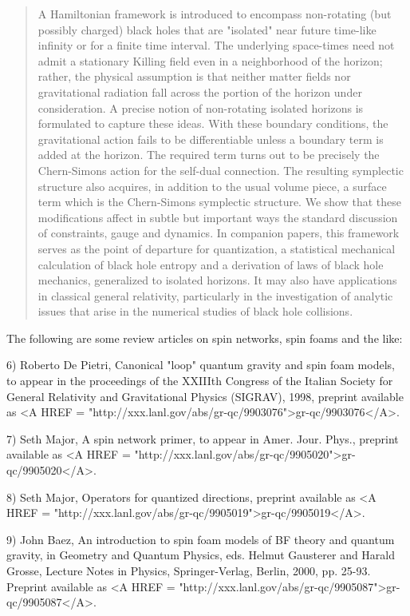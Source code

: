 \begin{quote}
A Hamiltonian framework is introduced to encompass non-rotating (but
possibly charged) black holes that are "isolated" near future
time-like infinity or for a finite time interval.  The underlying
space-times need not admit a stationary Killing field even in a
neighborhood of the horizon; rather, the physical assumption is that
neither matter fields nor gravitational radiation fall across the
portion of the horizon under consideration.  A precise notion of
non-rotating isolated horizons is formulated to capture these ideas.
With these boundary conditions, the gravitational action fails to be
differentiable unless a boundary term is added at the horizon.  The
required term turns out to be precisely the Chern-Simons action for the
self-dual connection.  The resulting symplectic structure also acquires,
in addition to the usual volume piece, a surface term which is the
Chern-Simons symplectic structure.  We show that these modifications
affect in subtle but important ways the standard discussion of
constraints, gauge and dynamics.  In companion papers, this framework
serves as the point of departure for quantization, a statistical
mechanical calculation of black hole entropy and a derivation of laws of
black hole mechanics, generalized to isolated horizons.  It may also have
applications in classical general relativity, particularly in the
investigation of analytic issues that arise in the numerical studies
of black hole collisions.
\end{quote}

The following are some review articles on spin networks, spin
foams and the like:


 6) Roberto De Pietri, Canonical "loop" quantum gravity and spin
foam models, to appear in the proceedings of the XXIIIth Congress of the
Italian Society for General Relativity and Gravitational Physics
(SIGRAV), 1998, preprint available as <A HREF =
"http://xxx.lanl.gov/abs/gr-qc/9903076">gr-qc/9903076</A>.


 7) Seth Major, A spin network primer, to appear in Amer. Jour. Phys.,
preprint available as <A HREF =
"http://xxx.lanl.gov/abs/gr-qc/9905020">gr-qc/9905020</A>.

8) Seth Major, Operators for quantized directions, preprint available
as <A HREF = "http://xxx.lanl.gov/abs/gr-qc/9905019">gr-qc/9905019</A>.

9) John Baez, An introduction to spin foam models of BF theory and quantum
gravity, in Geometry and Quantum Physics, eds. Helmut Gausterer and
Harald Grosse, Lecture Notes in Physics, Springer-Verlag, Berlin, 2000,
pp. 25-93.  Preprint available as <A HREF =
"http://xxx.lanl.gov/abs/gr-qc/9905087">gr-qc/9905087</A>.

